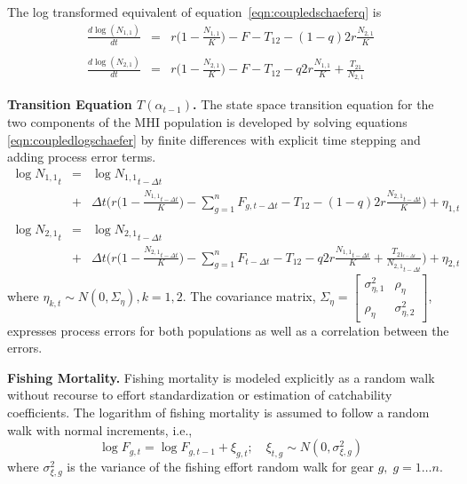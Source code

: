\documentclass[12pt,letterpaper]{article}
\newcommand\None{{N_{1,1}}}
\newcommand\Ntwo{{N_{2,1}}}
\begin{document}
The log transformed equivalent of equation~\ref{eqn:coupledschaeferq}
is
\begin{eqnarray}
\label{eqn:coupledlogschaefer}
\frac{d\log(\None)}{dt}&=&r\Big(1-\frac{\None}{K}\Big) -F - T_{12} -
(1-q)2r\frac{\Ntwo}{K}\nonumber\\
\\
\frac{d\log(\Ntwo)}{dt}&=&r\Big(1-\frac{\Ntwo}{K}\Big) -F - T_{12} -
q2r\frac{\None}{K} + \frac{T_{21}}{\Ntwo}\nonumber
\end{eqnarray}

{\bf Transition Equation $T(\alpha_{t-1})$.}
The state space transition equation for the two components of the MHI
population is developed by solving
equations \ref{eqn:coupledlogschaefer} by finite differences
with explicit time stepping and adding process error
terms.
\begin{eqnarray}
\log \None_t &=& \log \None_{t-\Delta t}\nonumber\\ 
             &+&\Delta t\bigg(r\Big(1-\frac{\None_{t-\Delta t}}{K}\Big)
-\sum_{g=1}^n F_{g,t-\Delta t} - T_{12} - (1-q)2r\frac{\Ntwo_{t-\Delta
t}}{K}\bigg)+\eta_{1,t}\nonumber\\
\\ \log \Ntwo_t &=& \log \Ntwo_{t-\Delta t}\nonumber\\
             &+&\Delta t\bigg(r\Big(1-\frac{\Ntwo_{t-\Delta t}}{K}\Big)
-\sum_{g=1}^n F_{t-\Delta t} - T_{12} - q2r\frac{\None_{t-\Delta t}}{K}
     +\frac{T_{{21}_{t-\Delta t}}}{\Ntwo_{t-\Delta t}}\bigg)+\eta_{2,t}\nonumber
\label{eqn:finitecoupledlogschaefer}
\end{eqnarray}
where $\eta_{k,t} \sim N(0,\Sigma_\eta),k=1,2$. The covariance matrix,
$\Sigma_\eta = \left[\begin{array}{cc}\sigma^2_{\eta,1}&\rho_\eta\\
                                     \rho_\eta&\sigma^2_{\eta,2}
\end{array}\right]$,
expresses process errors for both populations as well as a
correlation between the errors.

{\bf Fishing Mortality.}
Fishing mortality is
modeled explicitly as a random walk
without recourse to effort standardization or
estimation of catchability coefficients. The logarithm of fishing
mortality is assumed to
follow a random walk with normal increments, i.e.,
\begin{equation}
\log F_{g,t} = \log F_{g,t-1} + \xi_{g,t};\quad \xi_{t,g}\sim
N(0,\sigma^2_{\xi,g}) \label{eqn:Fwalk}
\end{equation}
where  $\sigma^2_{\xi,g}$ is the variance of the fishing
effort random walk for gear $g,\; g=1\ldots n$.
\end{document}
